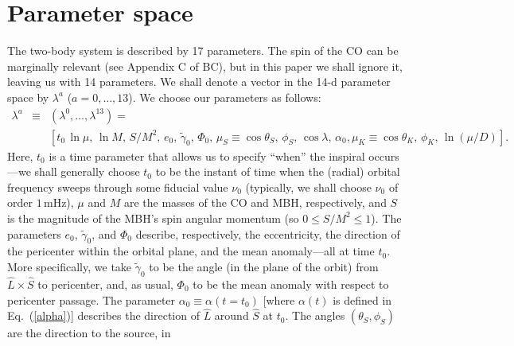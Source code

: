 \documentclass[11pt]{report}
\begin{document}
\section{Parameter space}
The two-body system is described by 17 parameters. The spin of the
CO can be marginally relevant (see Appendix C of BC), but in this paper
we shall ignore it, leaving us with 14 parameters.
We shall denote a vector in the 14-d parameter space by $\lambda^a$
($a=0,\ldots,13$).
We choose our parameters as follows:
\begin{eqnarray} \label{lambda}
\lambda^a &\equiv& (\lambda^0,\ldots,\lambda^{13}) =\nonumber\\
&&
\left[t_0\,\ln\mu,\,\ln M,\,S/M^2,\,e_0,\,\tilde\gamma_0,\,\Phi_0,\,
\mu_S\equiv\cos\theta_S,\,\phi_S,\,\cos\lambda,\,\alpha_0,
\mu_K\equiv\cos\theta_K,\,\phi_K,\,\ln(\mu/D)\right].
\end{eqnarray}
Here, $t_0$ is a time parameter that allows us to specify ``when''
the inspiral occurs---we shall generally choose $t_0$ to be the instant of
time when the (radial) orbital frequency sweeps through
some fiducial value $\nu_0$ (typically, we shall choose $\nu_0$ of
order $1\,$mHz),
$\mu$ and $M$ are the masses of the CO and MBH, respectively, and $S$ is the
magnitude of the MBH's spin angular momentum (so $0 \le S/M^2 \le 1$).
The parameters $e_0$, $\tilde\gamma_0$, and $\Phi_0$ describe,
respectively, the eccentricity, the direction of the pericenter within
the orbital plane, and the mean anomaly---all at time $t_0$.
More specifically, we take $\tilde\gamma_0$ to be the angle (in the plane
of the orbit) from $\hat L \times \hat S$ to pericenter, and, as usual,
$\Phi_0$ to be the mean anomaly with respect to pericenter passage.
The parameter $\alpha_0\equiv\alpha(t=t_0)$ [where $\alpha(t)$
is defined in Eq.~(\ref{alpha})] describes the direction
of $\hat L$ around $\hat S$ at $t_0$.
The angles $(\theta_S,\phi_S)$ are the direction to the source, in
\end{document}
